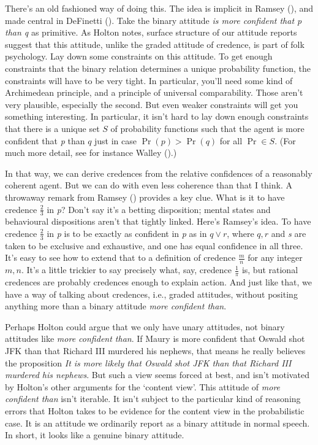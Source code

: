 \documentclass[
  11pt,
  letterpaper,
  DIV=11,
  numbers=noendperiod,
  twoside]{scrartcl}
\begin{document}
There's an old fashioned way of doing this. The idea is implicit in
Ramsey (), and made central in
DeFinetti (). Take the binary attitude
\emph{is more confident that p than q} as primitive. As Holton notes,
surface structure of our attitude reports suggest that this attitude,
unlike the graded attitude of credence, is part of folk psychology. Lay
down some constraints on this attitude. To get enough constraints that
the binary relation determines a unique probability function, the
constraints will have to be very tight. In particular, you'll need some
kind of Archimedean principle, and a principle of universal
comparability. Those aren't very plausible, especially the second. But
even weaker constraints will get you something interesting. In
particular, it isn't hard to lay down enough constraints that there is a
unique set \(S\) of probability functions such that the agent is more
confident that \emph{p} than \(q\) just in case \(\Pr( p) > \Pr(q)\) for
all \(\Pr \in S\). (For much more detail, see for instance Walley
().)

In that way, we can derive credences from the relative confidences of a
reasonably coherent agent. But we can do with even less coherence than
that I think. A throwaway remark from Ramsey
() provides a key clue. What is it
to have credence \(\frac{2}{3}\) in \emph{p}? Don't say it's a betting
disposition; mental states and behavioural dispositions aren't that
tightly linked. Here's Ramsey's idea. To have credence \(\frac{2}{3}\)
in \emph{p} is to be exactly as confident in \emph{p} as in
\(q \vee r\), where \(q, r\) and \emph{s} are taken to be exclusive and
exhaustive, and one has equal confidence in all three. It's easy to see
how to extend that to a definition of credence \(\frac{m}{n}\) for any
integer \(m, n\). It's a little trickier to say precisely what, say,
credence \(\frac{1}{\pi}\) is, but rational credences are probably
credences enough to explain action. And just like that, we have a way of
talking about credences, i.e., graded attitudes, without positing
anything more than a binary attitude \emph{more confident than}.

Perhaps Holton could argue that we only have unary attitudes, not binary
attitudes like \emph{more confident than}. If Maury is more confident
that Oswald shot JFK than that Richard III murdered his nephews, that
means he really believes the proposition \emph{It is more likely that
Oswald shot JFK than that Richard III murdered his nephews}. But such a
view seems forced at best, and isn't motivated by Holton's other
arguments for the `content view'. This attitude of \emph{more confident
than} isn't iterable. It isn't subject to the particular kind of
reasoning errors that Holton takes to be evidence for the content view
in the probabilistic case. It is an attitude we ordinarily report as a
binary attitude in normal speech. In short, it looks like a genuine
binary attitude.
\end{document}
